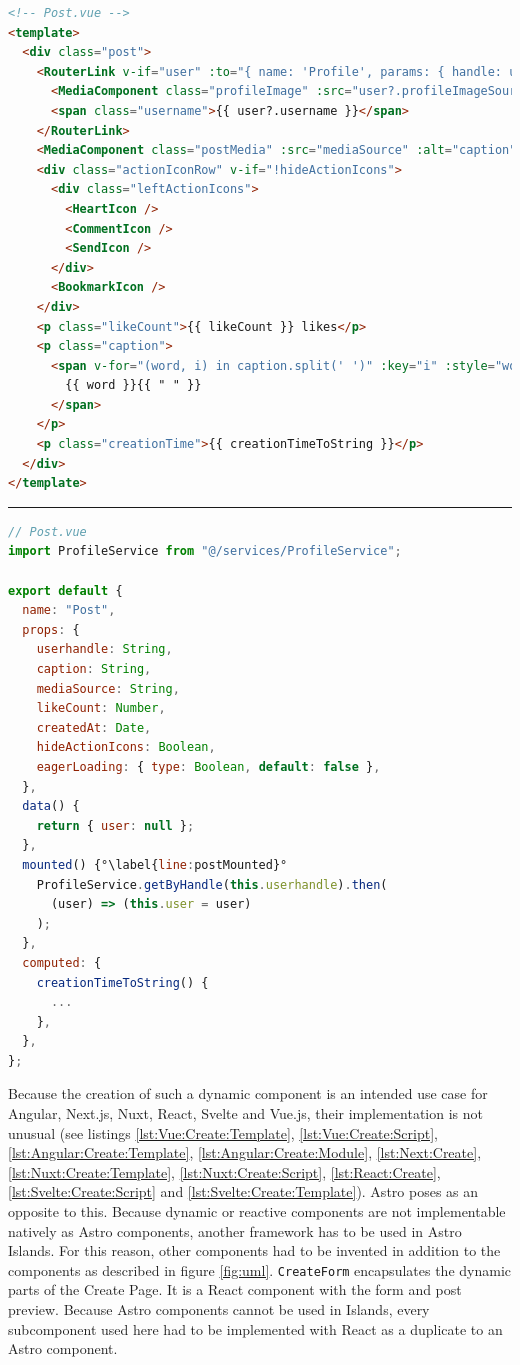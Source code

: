 \documentclass[a4paper, 12pt]{article}
\begin{document}
\vspace{1cm}
\begin{lstlisting}[caption=Post in Vue.js (Template), label={lst:Vue:Post:Template}, language=HTML]
<!-- Post.vue -->
<template>
  <div class="post">
    <RouterLink v-if="user" :to="{ name: 'Profile', params: { handle: userhandle } }" class="postUserInfo" >
      <MediaComponent class="profileImage" :src="user?.profileImageSource" alt="" width="44" height="44" />
      <span class="username">{{ user?.username }}</span>
    </RouterLink>
    <MediaComponent class="postMedia" :src="mediaSource" :alt="caption" width="100%" height="100%" :eagerLoading="eagerLoading" />
    <div class="actionIconRow" v-if="!hideActionIcons">
      <div class="leftActionIcons">
        <HeartIcon />
        <CommentIcon />
        <SendIcon />
      </div>
      <BookmarkIcon />
    </div>
    <p class="likeCount">{{ likeCount }} likes</p>
    <p class="caption">
      <span v-for="(word, i) in caption.split(' ')" :key="i" :style="word.startsWith('#') ? 'color: #0091E2' : ''">
        {{ word }}{{ " " }}
      </span>
    </p>
    <p class="creationTime">{{ creationTimeToString }}</p>
  </div>
</template>
\end{lstlisting}
\hrule
\begin{lstlisting}[caption=Post in Vue.js (Script), label={lst:Vue:Post:Script}, language=JavaScript, firstnumber=26, escapechar=°]
// Post.vue
import ProfileService from "@/services/ProfileService";

export default {
  name: "Post",
  props: {
    userhandle: String,
    caption: String,
    mediaSource: String,
    likeCount: Number,
    createdAt: Date,
    hideActionIcons: Boolean,
    eagerLoading: { type: Boolean, default: false },
  },
  data() {
    return { user: null };
  },
  mounted() {°\label{line:postMounted}°
    ProfileService.getByHandle(this.userhandle).then(
      (user) => (this.user = user)
    );
  },
  computed: {
    creationTimeToString() {
      ...
    },
  },
};
\end{lstlisting}
\vspace{1cm}

Because the creation of such a dynamic component is an intended use case for Angular, Next.js, Nuxt, React, Svelte and Vue.js, their implementation is not unusual (see listings \ref{lst:Vue:Create:Template}, \ref{lst:Vue:Create:Script}, \ref{lst:Angular:Create:Template}, \ref{lst:Angular:Create:Module}, \ref{lst:Next:Create}, \ref{lst:Nuxt:Create:Template}, \ref{lst:Nuxt:Create:Script}, \ref{lst:React:Create}, \ref{lst:Svelte:Create:Script} and \ref{lst:Svelte:Create:Template}).
Astro poses as an opposite to this.
Because dynamic or reactive components are not implementable natively as Astro components, another framework has to be used in Astro Islands.
For this reason, other components had to be invented in addition to the components as described in figure \ref{fig:uml}.
\verb|CreateForm| encapsulates the dynamic parts of the Create Page.
It is a React component with the form and post preview.
Because Astro components cannot be used in Islands, every subcomponent used here had to be implemented with React as a duplicate to an Astro component.
\end{document}
